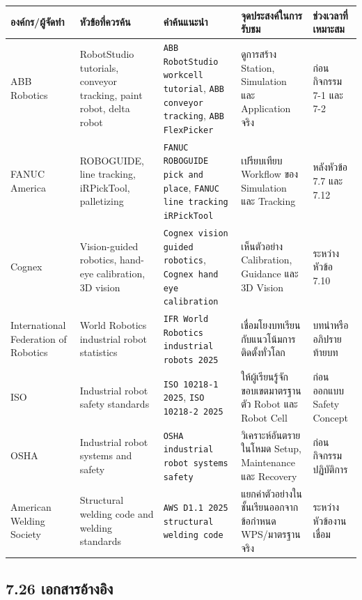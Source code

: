 \begin{table}[htbp]
    \centering
    \scriptsize
    \begin{tabularx}{\textwidth}{L{0.14\textwidth} L{0.18\textwidth} Y Y L{0.16\textwidth}}
        \hline
        \textbf{องค์กร/ผู้จัดทำ} & \textbf{หัวข้อที่ควรค้น} & \textbf{คำค้นแนะนำ} & \textbf{จุดประสงค์ในการรับชม} & \textbf{ช่วงเวลาที่เหมาะสม} \\
        \hline
        ABB Robotics & RobotStudio tutorials, conveyor tracking, paint robot, delta robot & \texttt{ABB RobotStudio workcell tutorial}, \texttt{ABB conveyor tracking}, \texttt{ABB FlexPicker} & ดูการสร้าง Station, Simulation และ Application จริง & ก่อนกิจกรรม 7-1 และ 7-2 \\
        FANUC America & ROBOGUIDE, line tracking, iRPickTool, palletizing & \texttt{FANUC ROBOGUIDE pick and place}, \texttt{FANUC line tracking iRPickTool} & เปรียบเทียบ Workflow ของ Simulation และ Tracking & หลังหัวข้อ 7.7 และ 7.12 \\
        Cognex & Vision-guided robotics, hand-eye calibration, 3D vision & \texttt{Cognex vision guided robotics}, \texttt{Cognex hand eye calibration} & เห็นตัวอย่าง Calibration, Guidance และ 3D Vision & ระหว่างหัวข้อ 7.10 \\
        International Federation of Robotics & World Robotics industrial robot statistics & \texttt{IFR World Robotics industrial robots 2025} & เชื่อมโยงบทเรียนกับแนวโน้มการติดตั้งทั่วโลก & บทนำหรืออภิปรายท้ายบท \\
        ISO & Industrial robot safety standards & \texttt{ISO 10218-1 2025}, \texttt{ISO 10218-2 2025} & ให้ผู้เรียนรู้จักขอบเขตมาตรฐานตัว Robot และ Robot Cell & ก่อนออกแบบ Safety Concept \\
        OSHA & Industrial robot systems and safety & \texttt{OSHA industrial robot systems safety} & วิเคราะห์อันตรายในโหมด Setup, Maintenance และ Recovery & ก่อนกิจกรรมปฏิบัติการ \\
        American Welding Society & Structural welding code and welding standards & \texttt{AWS D1.1 2025 structural welding code} & แยกค่าตัวอย่างในชั้นเรียนออกจากข้อกำหนด WPS/มาตรฐานจริง & ระหว่างหัวข้องานเชื่อม \\
        \hline
    \end{tabularx}
\end{table}



\subsection{7.26 เอกสารอ้างอิง}

